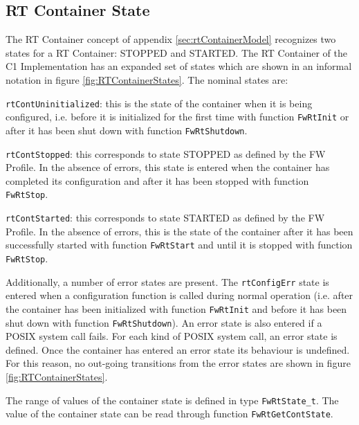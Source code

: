 \documentclass[a4paper,10pt]{article}
\newenvironment{fw_enumerate}					%
{\begin{enumerate}
  \setlength{\itemsep}{1mm}
  \setlength{\parskip}{0pt}
  \setlength{\parsep}{0pt}}
{\end{enumerate}}
\begin{document}
\subsection{RT Container State}\label{sec:contState}
The RT Container concept of appendix \ref{sec:rtContainerModel} recognizes two states for a RT Container: STOPPED and STARTED. The RT Container of the C1 Implementation has an expanded set of states which are shown in an informal notation in figure \ref{fig:RTContainerStates}. The nominal states are:

\begin{fw_enumerate}
\item \texttt{rtContUninitialized}: this is the state of the container when it is being configured, i.e. before it is initialized for the first time with function \texttt{FwRtInit} or after it has been shut down with function \texttt{FwRtShutdown}.
\item \texttt{rtContStopped}: this corresponds to state STOPPED as defined by the FW Profile. In the absence of errors, this state is entered when the container has completed its configuration and after it has been stopped with function \texttt{FwRtStop}.
\item \texttt{rtContStarted}: this corresponds to state STARTED as defined by the FW Profile. In the absence of errors, this is the state of the container after it has been successfully started with function \texttt{FwRtStart}  and until it is stopped with function \texttt{FwRtStop}.
\end{fw_enumerate}

Additionally, a number of error states are present. The \texttt{rtConfigErr} state is entered when a configuration function is called during normal operation (i.e. after the container has been initialized with function \texttt{FwRtInit} and before it has been shut down with function \texttt{FwRtShutdown}). An error state is also entered if a POSIX system call fails. For each kind of POSIX system call, an error state is defined. Once the container has entered an error state its behaviour is undefined. For this reason, no out-going transitions from the error states are shown in figure \ref{fig:RTContainerStates}.

The range of values of the container state is defined in type \texttt{FwRtState\_t}. The value of the container state can be read through function \texttt{FwRtGetContState}.
 
\end{document}
